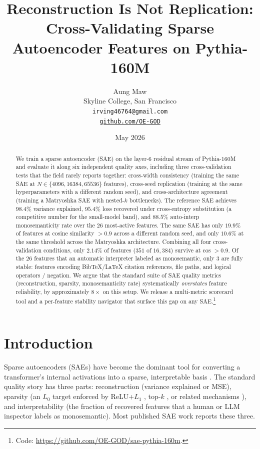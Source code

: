 \documentclass[11pt]{article}
\title{Reconstruction Is Not Replication: \\
       Cross-Validating Sparse Autoencoder Features on Pythia-160M}
\author{Aung Maw\\
        Skyline College, San Francisco\\
        \texttt{irving46764@gmail.com} \\
        \href{https://github.com/OE-GOD}{\texttt{github.com/OE-GOD}}}
\date{May 2026}
\begin{document}
\maketitle

\begin{abstract}
We train a sparse autoencoder (SAE) on the layer-6 residual stream of
Pythia-160M and evaluate it along six independent quality axes, including
three cross-validation tests that the field rarely reports together:
cross-width consistency (training the same SAE at $N \in \{4096, 16384,
65536\}$ features), cross-seed replication (training at the same
hyperparameters with a different random seed), and cross-architecture
agreement (training a Matryoshka SAE \cite{bussmann2025matryoshka} with
nested-$k$ bottlenecks).
The reference SAE achieves $98.4\%$ variance explained, $95.4\%$ loss
recovered under cross-entropy substitution (a competitive number for the
small-model band), and $88.5\%$ auto-interp monosemanticity rate over the
$26$ most-active features.
The same SAE has only $19.9\%$ of features at cosine similarity $> 0.9$
across a different random seed, and only $10.6\%$ at the same threshold
across the Matryoshka architecture. Combining all four cross-validation
conditions, only $2.14\%$ of features ($351$ of $16{,}384$) survive at
cos $> 0.9$. Of the $26$ features that an automatic interpreter labeled
as monosemantic, only $3$ are fully stable: features encoding BibTeX/LaTeX
citation references, file paths, and logical operators / negation.
We argue that the standard suite of SAE quality metrics
(reconstruction, sparsity, monosemanticity rate) systematically
\emph{overstates} feature reliability, by approximately $8\times$ on this
setup. We release a multi-metric scorecard tool and a per-feature
stability navigator that surface this gap on any SAE.\footnote{Code:
\url{https://github.com/OE-GOD/sae-pythia-160m}.}
\end{abstract}

\section{Introduction}

Sparse autoencoders (SAEs) have become the dominant tool for converting a
transformer's internal activations into a sparse, interpretable basis
\cite{bricken2023monosemanticity, templeton2024scaling}.
The standard quality story has three parts: reconstruction (variance
explained or MSE), sparsity (an $L_0$ target enforced by ReLU+$L_1$
\cite{bricken2023monosemanticity}, top-$k$ \cite{gao2024topk}, or related
mechanisms \cite{rajamanoharan2024gated, rajamanoharan2024jumprelu}), and
interpretability (the fraction of recovered features that a human or LLM
inspector labels as monosemantic). Most published SAE work reports these
three.
\end{document}
